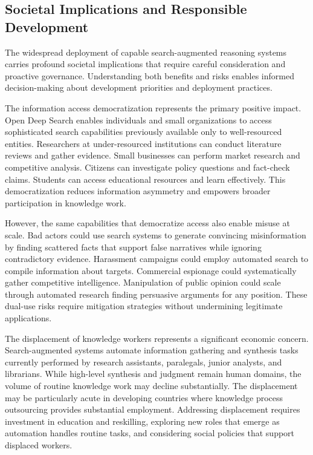 \subsection{Societal Implications and Responsible Development}

The widespread deployment of capable search-augmented reasoning systems carries profound societal implications that require careful consideration and proactive governance. Understanding both benefits and risks enables informed decision-making about development priorities and deployment practices.

The information access democratization represents the primary positive impact. Open Deep Search enables individuals and small organizations to access sophisticated search capabilities previously available only to well-resourced entities. Researchers at under-resourced institutions can conduct literature reviews and gather evidence. Small businesses can perform market research and competitive analysis. Citizens can investigate policy questions and fact-check claims. Students can access educational resources and learn effectively. This democratization reduces information asymmetry and empowers broader participation in knowledge work.

However, the same capabilities that democratize access also enable misuse at scale. Bad actors could use search systems to generate convincing misinformation by finding scattered facts that support false narratives while ignoring contradictory evidence. Harassment campaigns could employ automated search to compile information about targets. Commercial espionage could systematically gather competitive intelligence. Manipulation of public opinion could scale through automated research finding persuasive arguments for any position. These dual-use risks require mitigation strategies without undermining legitimate applications.

The displacement of knowledge workers represents a significant economic concern. Search-augmented systems automate information gathering and synthesis tasks currently performed by research assistants, paralegals, junior analysts, and librarians. While high-level synthesis and judgment remain human domains, the volume of routine knowledge work may decline substantially. The displacement may be particularly acute in developing countries where knowledge process outsourcing provides substantial employment. Addressing displacement requires investment in education and reskilling, exploring new roles that emerge as automation handles routine tasks, and considering social policies that support displaced workers.

